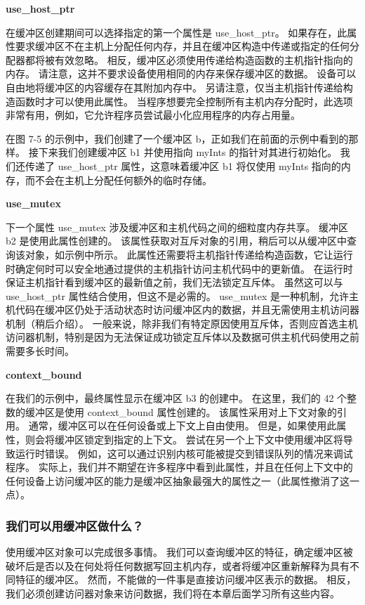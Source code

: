 \textbf{use\_host\_ptr}

在缓冲区创建期间可以选择指定的第一个属性是 use\_host\_ptr。 如果存在，此属性要求缓冲区不在主机上分配任何内存，并且在缓冲区构造中传递或指定的任何分配器都将被有效忽略。 相反，缓冲区必须使用传递给构造函数的主机指针指向的内存。 请注意，这并不要求设备使用相同的内存来保存缓冲区的数据。 设备可以自由地将缓冲区的内容缓存在其附加内存中。 另请注意，仅当主机指针传递给构造函数时才可以使用此属性。 当程序想要完全控制所有主机内存分配时，此选项非常有用，例如，它允许程序员尝试最小化应用程序的内存占用量。

在图 7-5 的示例中，我们创建了一个缓冲区 b，正如我们在前面的示例中看到的那样。 接下来我们创建缓冲区 b1 并使用指向 myInts 的指针对其进行初始化。 我们还传递了 use\_host\_ptr 属性，这意味着缓冲区 b1 将仅使用 myInts 指向的内存，而不会在主机上分配任何额外的临时存储。

\textbf{use\_mutex}

下一个属性 use\_mutex 涉及缓冲区和主机代码之间的细粒度内存共享。 缓冲区 b2 是使用此属性创建的。 该属性获取对互斥对象的引用，稍后可以从缓冲区中查询该对象，如示例中所示。 此属性还需要将主机指针传递给构造函数，它让运行时确定何时可以安全地通过提供的主机指针访问主机代码中的更新值。 在运行时保证主机指针看到缓冲区的最新值之前，我们无法锁定互斥体。 虽然这可以与 use\_host\_ptr 属性结合使用，但这不是必需的。 use\_mutex 是一种机制，允许主机代码在缓冲区仍处于活动状态时访问缓冲区内的数据，并且无需使用主机访问器机制（稍后介绍）。 一般来说，除非我们有特定原因使用互斥体，否则应首选主机访问器机制，特别是因为无法保证成功锁定互斥体以及数据可供主机代码使用之前需要多长时间。

\textbf{context\_bound}

在我们的示例中，最终属性显示在缓冲区 b3 的创建中。 在这里，我们的 42 个整数的缓冲区是使用 context\_bound 属性创建的。 该属性采用对上下文对象的引用。 通常，缓冲区可以在任何设备或上下文上自由使用。 但是，如果使用此属性，则会将缓冲区锁定到指定的上下文。 尝试在另一个上下文中使用缓冲区将导致运行时错误。 例如，这可以通过识别内核可能被提交到错误队列的情况来调试程序。 实际上，我们并不期望在许多程序中看到此属性，并且在任何上下文中的任何设备上访问缓冲区的能力是缓冲区抽象最强大的属性之一（此属性撤消了这一点）。

\subsubsection{我们可以用缓冲区做什么？}
使用缓冲区对象可以完成很多事情。 我们可以查询缓冲区的特征，确定缓冲区被破坏后是否以及在何处将任何数据写回主机内存，或者将缓冲区重新解释为具有不同特征的缓冲区。 然而，不能做的一件事是直接访问缓冲区表示的数据。 相反，我们必须创建访问器对象来访问数据，我们将在本章后面学习所有这些内容。

